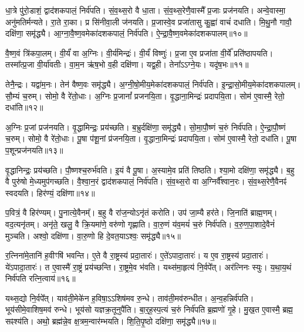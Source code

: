 धा॒त्रे पु॑रो॒डाशं॒ द्वाद॑शकपालं॒ निर्व॑पति।
सं॒व॒थ्स॒रो वै धा॒ता।
सं॒व॒थ्स॒रेणै॒वास्मै᳚ प्र॒जाः प्रज॑नयति।
अन्वे॒वास्मा॒ अनु॑मतिर्मन्यते।
रा॒ते रा॒का।
प्र सि॑नीवा॒ली ज॑नयति।
प्र॒जास्वे॒व प्रजा॑तासु कु॒ह्वा॑ वाचं॑ दधाति।
मि॒थु॒नौ गावौ॒ दक्षि॑णा॒ समृ॑द्ध्यै।
आ॒ग्ना॒वै॒ष्ण॒वमेका॑\-दश\-कपालं॒ निर्व॑पति।
ऐ॒न्द्रा॒वै॒ष्ण॒वमेका॑\-दश\-कपालम्॥१०॥

वै॒ष्ण॒वं त्रि॑कपा॒लम्।
वी॒र्यं॑ वा अ॒ग्निः।
वी॒र्य॑मिन्द्रः॑।
वी॒र्यं॑ विष्णुः॑।
प्र॒जा ए॒व प्रजा॑ता वी॒र्ये᳚ प्रति॑\-ष्ठापयति।
तस्मा᳚त्प्र॒जा वी॒र्या॑वतीः।
वा॒म॒न ऋ॑ष॒भो व॒ही दक्षि॑णा।
यद्व॒ही।
तेना᳚ऽऽग्ने॒यः।
यदृ॑ष॒भः॥११॥

तेनै॒न्द्रः।
यद्वा॑म॒नः।
तेन॑ वैष्ण॒वः समृ॑द्ध्यै।
अ॒ग्नी॒षो॒मीय॒मेका॑\-दश\-कपालं॒ निर्व॑पति।
इ॒न्द्रा॒सो॒मीय॒मेका॑\-दश\-कपालम्।
सौ॒म्यं च॒रुम्।
सोमो॒ वै रे॑तो॒धाः।
अ॒ग्निः प्र॒जानां᳚ प्रजनयि॒ता।
वृ॒द्धाना॒मिन्द्रः॑ प्रदापयि॒ता।
सोम॑ ए॒वास्मै॒ रेतो॒ दधा॑ति॥१२॥

अ॒ग्निः प्र॒जां प्रज॑नयति।
वृ॒द्धामिन्द्रः॒ प्रय॑च्छति।
ब॒भ्रुर्दक्षि॑णा॒ समृ॑द्ध्यै।
सो॒मा॒पौ॒ष्णं च॒रुं निर्व॑पति।
ऐ॒न्द्रा॒पौ॒ष्णं च॒रुम्।
सोमो॒ वै रे॑तो॒धाः।
पू॒षा प॑शू॒नां प्र॑जनयि॒ता।
वृ॒द्धाना॒मिन्द्रः॑ प्रदापयि॒ता।
सोम॑ ए॒वास्मै॒ रेतो॒ दधा॑ति।
पू॒षा प॒शून्प्रज॑नयति॥१३॥

वृ॒द्धानिन्द्रः॒ प्रय॑च्छति।
पौ॒ष्णश्च॒रुर्भ॑वति।
इ॒यं वै पू॒षा।
अ॒स्यामे॒व प्रति॑ तिष्ठति।
श्या॒मो दक्षि॑णा॒ समृ॑द्ध्यै।
ब॒हु वै पुरु॑षो मे॒ध्यमुप॑गच्छति।
वै॒श्वा॒न॒रं द्वाद॑शकपालं॒ निर्व॑पति।
सं॒व॒थ्स॒रो वा अ॒ग्निर्वै᳚श्वान॒रः।
सं॒व॒थ्स॒रेणै॒वैनꣴ॑ स्वदयति।
हिर॑ण्यं॒ दक्षि॑णा॥१४॥

प॒वित्रं॒ वै हिर॑ण्यम्।
पु॒नात्ये॒वैनम्᳚।
ब॒हु वै रा॑ज॒न्यो\-ऽनृ॑तं करोति।
उप॑ जा॒म्यै हर॑ते।
जि॒नाति॑ ब्राह्म॒णम्।
वद॒त्यनृ॑तम्।
अनृ॑ते॒ खलु॒ वै क्रि॒यमा॑णे॒ वरु॑णो गृह्णाति।
वा॒रु॒णं य॑व॒मयं॑ च॒रुं निर्व॑पति।
व॒रु॒ण॒पा॒शादे॒वैनं॑ मुञ्चति।
अश्वो॒ दक्षि॑णा।
वा॒रु॒णो हि दे॒वत॒या\-ऽश्वः॒ समृ॑द्ध्यै॥१५॥\anuvakamend[ऐ॒न्द्रा॒वै॒ष्ण॒वमेका॑\-दश\-कपालं॒ यदृ॑ष॒भो दधा॑ति पू॒षा प॒शून्प्रज॑नयति॒ हिर॑ण्यं॒ दक्षि॑णा॒ दक्षि॒णैकं॑ च]

र॒त्निना॑मे॒तानि॑ ह॒वीꣳषि॑ भवन्ति।
ए॒ते वै रा॒ष्ट्रस्य॑ प्रदा॒तारः॑।
ए॒ते॑\-ऽपादा॒तारः॑।
य ए॒व रा॒ष्ट्रस्य॑ प्रदा॒तारः॑।
ये॑ऽपादा॒तारः॑।
त ए॒वास्मै॑ रा॒ष्ट्रं प्रय॑च्छन्ति।
रा॒ष्ट्रमे॒व भ॑वति।
यथ्स॑मा॒हृत्य॑ नि॒र्वपे᳚त्।
अर॑त्निनः स्युः।
य॒था॒य॒थं निर्व॑पति रत्नि॒त्वाय॑॥१६॥

यथ्स॒द्यो नि॒र्वपे᳚त्।
याव॑ती॒मेके॑न ह॒विषा॒\-ऽऽशिष॑मव रु॒न्धे।
ताव॑ती॒मव॑रुन्धीत।
अ॒न्व॒हन्निर्व॑पति।
भूय॑सीमे॒वाशिष॒मव॑ रुन्धे।
भूय॑सो यज्ञक्र॒तूनुपै॑ति।
बा॒र्॒ह॒स्प॒त्यं च॒रुं निर्व॑पति ब्र॒ह्मणो॑ गृ॒हे।
मु॒ख॒त ए॒वास्मै॒ ब्रह्म॒ सꣴश्य॑ति।
अथो॒ ब्रह्म॑न्ने॒व क्ष॒त्रम॒न्वार॑म्भयति।
शि॒ति॒पृ॒ष्ठो दक्षि॑णा॒ समृ॑द्ध्यै॥१७॥

